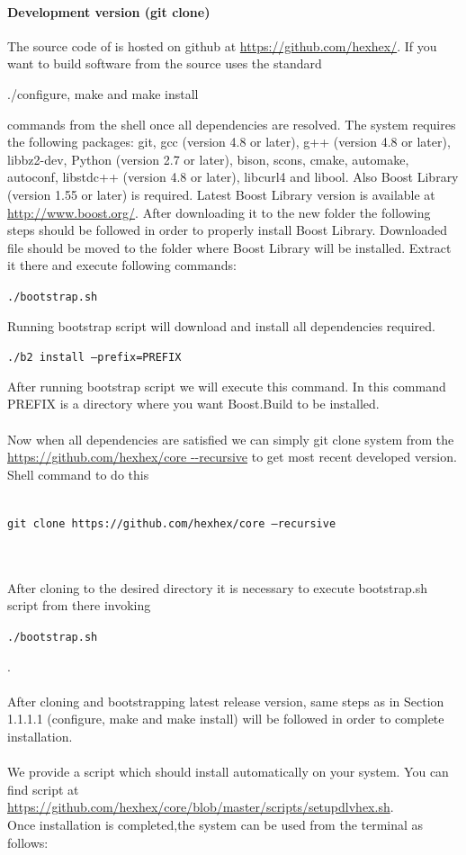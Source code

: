 \documentclass[14pt,a4paper, titlepage]{article}
\begin{document}
\paragraph{Development version (git clone)}
The source code of \dlvhex{} is hosted on github at \url{https://github.com/hexhex/}. If you want to build software from the source \dlvhex{} uses the standard \\ \centerline{./configure, make and make install} commands from the shell once all dependencies are resolved. The system requires the following packages: git, gcc (version 4.8 or later), g++ (version 4.8 or later), libbz2-dev, Python (version 2.7 or later), bison, scons, cmake, automake, autoconf, libstdc++ (version 4.8 or later), libcurl4 and libool. Also Boost Library (version 1.55 or later) is required. Latest Boost Library version is available at \url{http://www.boost.org/}. After downloading it to the new folder the following steps should be followed in order to properly install Boost Library. Downloaded file should be moved to the folder where Boost Library will be installed. Extract it there and execute following commands:
\\ \centerline{\texttt{./bootstrap.sh}}
Running bootstrap script will download and install all dependencies required.
\centerline{\texttt{./b2 install --prefix=PREFIX}} After running bootstrap script we will execute this command. In this command PREFIX is a directory where you want Boost.Build to be installed.  
\\ \\Now when all dependencies are satisfied we can simply git clone system from the \url{https://github.com/hexhex/core --recursive} to get most recent developed version. Shell command to do this
\\ \\ \centerline{\texttt{git clone https://github.com/hexhex/core --recursive}} 
\\ \\After cloning to the desired directory it is necessary to execute bootstrap.sh script from there invoking \\ \centerline{\texttt{./bootstrap.sh}}. 
\\ \\After cloning and bootstrapping latest release version, same steps as in Section 1.1.1.1 (configure, make and make install) will be followed in order to complete installation.  \\ \\We provide a script which should install \dlvhex{} automatically on your system. You can find script at \url{https://github.com/hexhex/core/blob/master/scripts/setupdlvhex.sh}.\\Once installation is completed,the system can be used from the terminal as follows:\\ 
\end{document}
